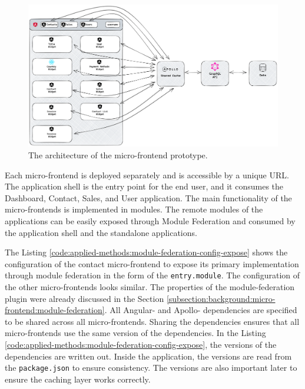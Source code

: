 \ifshowImages
\begin{figure}[H]
    \centering
    \includegraphics[width=1\linewidth]{images/applied-methods/prototypical-implementation/host-architecture.png}
    \caption{The architecture of the micro-frontend prototype.}\label{fig:applied-methods:prototype-micro-frontend-architecture}
\end{figure}
\fi

\noindent Each micro-frontend is deployed separately and is accessible by a unique \ac{URL}. The application shell is the entry point for the end user, and it consumes the Dashboard, Contact, Sales, and User application. The main functionality of the micro-frontends is implemented in modules. The remote modules of the applications can be easily exposed through Module Federation and consumed by the application shell and the standalone applications.

\bigskip

\noindent The Listing \ref{code:applied-methods:module-federation-config-expose} shows the configuration of the contact micro-frontend to expose its primary implementation through module federation in the form of the \texttt{entry.module}. The configuration of the other micro-frontends looks similar. The properties of the module-federation plugin were already discussed in the Section \ref{subsection:background:micro-frontend:module-federation}. All Angular- and Apollo- dependencies are specified to be shared across all micro-frontends. Sharing the dependencies ensures that all micro-frontends use the same version of the dependencies. In the Listing \ref{code:applied-methods:module-federation-config-expose}, the versions of the dependencies are written out. Inside the application, the versions are read from the \texttt{package.json} to ensure consistency. The versions are also important later to ensure the caching layer works correctly.

